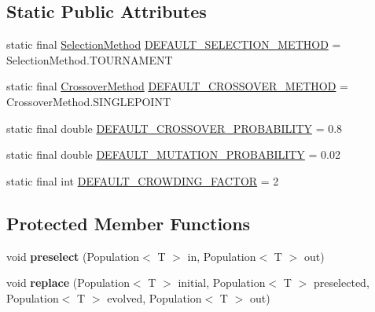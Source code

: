 \subsection*{Static Public Attributes}
\begin{CompactItemize}
\item 
static final \hyperlink{classjenes_1_1stage_1_1operator_1_1common_1_1_de_jong_crowder_3_01_t_01extends_01_chromosome_01_4_4c04a136973e222068a9b2bad6593645}{SelectionMethod} \hyperlink{classjenes_1_1stage_1_1operator_1_1common_1_1_de_jong_crowder_3_01_t_01extends_01_chromosome_01_4_21277e6e0728d4e83cc353337bc5f66d}{DEFAULT\_\-SELECTION\_\-METHOD} = SelectionMethod.TOURNAMENT
\item 
static final \hyperlink{classjenes_1_1stage_1_1operator_1_1common_1_1_de_jong_crowder_3_01_t_01extends_01_chromosome_01_4_cd306135cc2dd505a1a981b36f4696ea}{CrossoverMethod} \hyperlink{classjenes_1_1stage_1_1operator_1_1common_1_1_de_jong_crowder_3_01_t_01extends_01_chromosome_01_4_2798047916292a1449952a7274f9f26d}{DEFAULT\_\-CROSSOVER\_\-METHOD} = CrossoverMethod.SINGLEPOINT
\item 
static final double \hyperlink{classjenes_1_1stage_1_1operator_1_1common_1_1_de_jong_crowder_3_01_t_01extends_01_chromosome_01_4_522c94dff2a39743f6dfddec03a2ce47}{DEFAULT\_\-CROSSOVER\_\-PROBABILITY} = 0.8
\item 
static final double \hyperlink{classjenes_1_1stage_1_1operator_1_1common_1_1_de_jong_crowder_3_01_t_01extends_01_chromosome_01_4_19680564524e8d194044526740001c84}{DEFAULT\_\-MUTATION\_\-PROBABILITY} = 0.02
\item 
static final int \hyperlink{classjenes_1_1stage_1_1operator_1_1common_1_1_de_jong_crowder_3_01_t_01extends_01_chromosome_01_4_7e7afe01b26af0cdd28d392ab7866576}{DEFAULT\_\-CROWDING\_\-FACTOR} = 2
\end{CompactItemize}
\subsection*{Protected Member Functions}
\begin{CompactItemize}
\item 
\hypertarget{classjenes_1_1stage_1_1operator_1_1common_1_1_de_jong_crowder_3_01_t_01extends_01_chromosome_01_4_98f463e26bf3fd0fd703320007302594}{
void \textbf{preselect} (Population$<$ T $>$ in, Population$<$ T $>$ out)}
\label{classjenes_1_1stage_1_1operator_1_1common_1_1_de_jong_crowder_3_01_t_01extends_01_chromosome_01_4_98f463e26bf3fd0fd703320007302594}

\item 
\hypertarget{classjenes_1_1stage_1_1operator_1_1common_1_1_de_jong_crowder_3_01_t_01extends_01_chromosome_01_4_7d659276ad2103199080458c85acf59e}{
void \textbf{replace} (Population$<$ T $>$ initial, Population$<$ T $>$ preselected, Population$<$ T $>$ evolved, Population$<$ T $>$ out)}
\label{classjenes_1_1stage_1_1operator_1_1common_1_1_de_jong_crowder_3_01_t_01extends_01_chromosome_01_4_7d659276ad2103199080458c85acf59e}

\end{CompactItemize}
